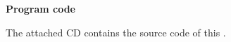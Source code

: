 \cleardoublepage{}
\thispagestyle{empty}
\huge\hspace{5cm}\textbf{Program code}\normalsize\vspace{2cm}

\noindent The attached CD contains the source code of this \getDoctypeShort{}.
